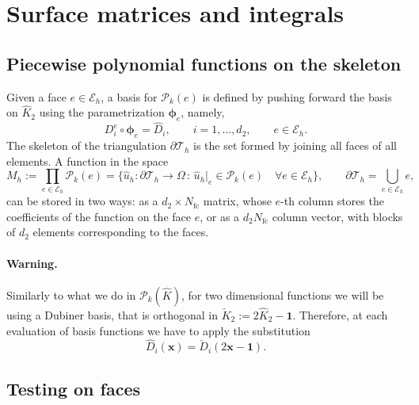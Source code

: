 \documentclass[10pt,english]{article}
\newcommand{\Nfc}{{N_{\mathrm{fc}}}}
\begin{document}
\section{Surface matrices and integrals}

\subsection{Piecewise polynomial functions on the skeleton}

Given a face $e\in \mathcal E_h$, a basis for $\mathcal P_k(e)$ is defined by pushing forward the basis on $\widehat K_2$ using the parametrization $\boldsymbol\phi_e$, namely,
\[
D_i^e\circ\boldsymbol\phi_e=\widehat D_i, \qquad i=1,\ldots,d_2, \qquad e \in \mathcal E_h.
\]
The skeleton of the triangulation $\partial\mathcal T_h$ is the set formed by joining all faces of all elements.
A function in the space
\[
M_h:=\prod_{e\in \mathcal E_h} \mathcal P_k(e) =\{ \widehat u_h:\partial\mathcal T_h \to \Omega\,:\, \widehat u_h|_e\in \mathcal P_k(e) \quad \forall e\in \mathcal E_h\}, \qquad \partial\mathcal T_h=\bigcup_{e\in \mathcal E_h} e,
\]
can be stored in two ways: as a $d_2\times \Nfc$ matrix, whose $e$-th column stores the coefficients of the function on the face $e$, or as a $d_2\Nfc$ column vector, with blocks of $d_2$ elements corresponding to the faces.

\paragraph{Warning.} Similarly to what we do in $\mathcal P_k(\widehat K)$, for two dimensional functions we will be using a Dubiner basis, that is orthogonal in $\check K_2:=2\widehat K_2-\mathbf 1$. Therefore, at each evaluation of basis functions we have to apply the substitution
\[
\widehat D_i(\mathbf x)=\check D_i(2\mathbf x-\mathbf 1).
\]

\subsection{Testing on faces}\label{sec:4.2}
\end{document}
